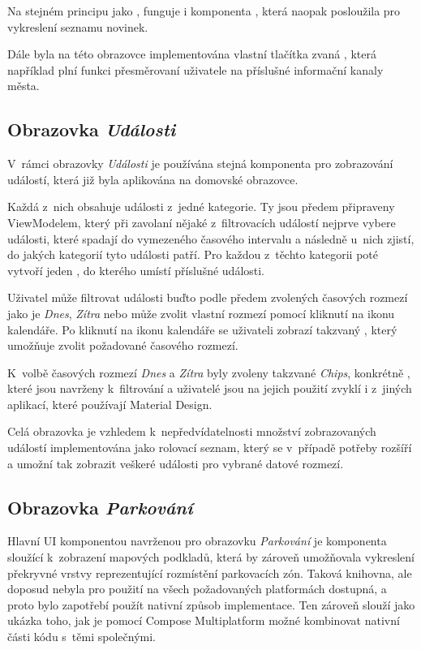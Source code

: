 Na stejném principu jako , funguje i komponenta , která naopak posloužila pro vykreslení seznamu novinek.

Dále byla na této obrazovce implementována vlastní tlačítka zvaná , která například plní funkci přesměrovaní uživatele na 
příslušné informační kanaly města.  



\subsection{Obrazovka \textit{Události}}

V~rámci obrazovky \textit{Události} je používána stejná komponenta pro zobrazování událostí, která již byla aplikována na domovské obrazovce. 


Každá z~nich obsahuje události z~jedné kategorie. Ty jsou předem připraveny ViewModelem, který při zavolaní nějaké z~filtrovacích
událostí nejprve vybere události, které spadají do vymezeného časového intervalu a následně u~nich zjistí, do jakých kategorií tyto
události patří. Pro každou z~těchto kategorii poté vytvoří jeden , do kterého umístí příslušné události.

Uživatel může filtrovat události buďto podle předem zvolených časových rozmezí jako je \textit{Dnes}, \textit{Zítra} nebo může zvolit vlastní 
rozmezí pomocí kliknutí na ikonu kalendáře. Po kliknutí na ikonu kalendáře se uživateli zobrazí takzvaný , který umožňuje zvolit požadované časového rozmezí.

K~volbě časových rozmezí \textit{Dnes} a \textit{Zítra} byly zvoleny takzvané \textit{Chips}, konkrétně , které jsou 
navrženy k~filtrování a uživatelé jsou na jejich použití zvyklí i z~jiných aplikací, které používají Material Design.

Celá obrazovka je vzhledem k~nepředvídatelnosti množství zobrazovaných událostí implementována jako rolovací seznam, který se v~případě potřeby
rozšíří a umožní tak zobrazit veškeré události pro vybrané datové rozmezí.

\subsection{Obrazovka \textit{Parkování}} \label{parkingScreenImpl}
Hlavní UI komponentou navrženou pro obrazovku \textit{Parkování} je komponenta sloužící k~zobrazení mapových podkladů, která by zároveň umožňovala 
vykreslení překryvné vrstvy reprezentující rozmístění parkovacích zón. Taková knihovna, ale doposud nebyla pro použití na všech požadovaných 
platformách dostupná, a proto bylo zapotřebí použít nativní způsob implementace. Ten zároveň slouží jako ukázka toho, jak je pomocí 
Compose Multiplatform možné kombinovat nativní části kódu s~těmi společnými.

